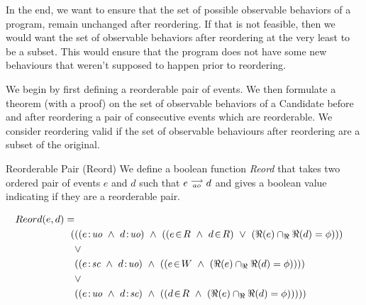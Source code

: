     In the end, we want to ensure that the set of possible observable behaviors of a program, remain unchanged after reordering. If that is not feasible, then we would want the set of observable behaviors after reordering at the very least to be a subset. This would ensure that the program does not have some new behaviours that weren't supposed to happen prior to reordering. 
    
    We begin by first defining a reorderable pair of events. We then formulate a theorem (with a proof) on the set of observable behaviors of a Candidate before and after reordering a pair of consecutive events which are reorderable. We consider reordering valid if the set of observable behaviours after reordering are a subset of the original. 

    \begin{definition}{Reorderable Pair (Reord)}
        We define a boolean function \emph{Reord} that takes two ordered pair of events $e$ and $d$ such that $e\stackrel{\longrightarrow}{_{ao}}d$ and gives a boolean value indicating if they are a reorderable pair. 
        
        \begin{align*}
            Reord(e,d) = \\
            (
            &((\et{e}{uo} \ \wedge \ \et{d}{uo}) \ \wedge \ 
                    (   
                        (\event{e}{R} \ \wedge \ \event{d}{R}) \ \vee \ 
                        (\Re(e) \cap_\Re \Re(d) = \phi) 
                    )
            ) \\ &\vee \\
            &((\et{e}{sc} \ \wedge \ \et{d}{uo}) \ \wedge \ 
                    (
                        (\event{e}{W} \ \wedge \ (\Re(e) \cap_\Re \Re(d) = \phi)) 
                    )
            ) \\ &\vee \\
            &((\et{e}{uo} \ \wedge \ \et{d}{sc}) \ \wedge \ 
                    (
                        (\event{d}{R} \ \wedge \ (\Re(e) \cap_\Re \Re(d) = \phi)) 
                    )
            )
            )
        \end{align*}


         
    \end{definition}

    

    

    

    

\subsection{}

    

    
    
    
    
    
